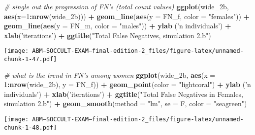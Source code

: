 \documentclass[]{article}
\newenvironment{Shaded}{\begin{snugshade}}{\end{snugshade}}
\newcommand{\KeywordTok}[1]{\textcolor[rgb]{0.13,0.29,0.53}{\textbf{#1}}}
\newcommand{\DataTypeTok}[1]{\textcolor[rgb]{0.13,0.29,0.53}{#1}}
\newcommand{\DecValTok}[1]{\textcolor[rgb]{0.00,0.00,0.81}{#1}}
\newcommand{\StringTok}[1]{\textcolor[rgb]{0.31,0.60,0.02}{#1}}
\newcommand{\CommentTok}[1]{\textcolor[rgb]{0.56,0.35,0.01}{\textit{#1}}}
\newcommand{\OperatorTok}[1]{\textcolor[rgb]{0.81,0.36,0.00}{\textbf{#1}}}
\newcommand{\NormalTok}[1]{#1}
\begin{document}
\begin{Shaded}
\begin{Highlighting}[]
\CommentTok{# single out the progression of FN's (total count values)}
\KeywordTok{ggplot}\NormalTok{(wide_2b, }\KeywordTok{aes}\NormalTok{(}\DataTypeTok{x=}\DecValTok{1}\OperatorTok{:}\KeywordTok{nrow}\NormalTok{(wide_2b))) }\OperatorTok{+}\StringTok{ }
\StringTok{  }\KeywordTok{geom_line}\NormalTok{(}\KeywordTok{aes}\NormalTok{(}\DataTypeTok{y =}\NormalTok{ FN_f, }\DataTypeTok{color =} \StringTok{"females"}\NormalTok{)) }\OperatorTok{+}
\StringTok{  }\KeywordTok{geom_line}\NormalTok{(}\KeywordTok{aes}\NormalTok{(}\DataTypeTok{y =}\NormalTok{ FN_m, }\DataTypeTok{color =} \StringTok{"males"}\NormalTok{)) }\OperatorTok{+}
\StringTok{  }\KeywordTok{ylab}\NormalTok{ (}\StringTok{'n individuals'}\NormalTok{) }\OperatorTok{+}\StringTok{ }\KeywordTok{xlab}\NormalTok{(}\StringTok{'iterations'}\NormalTok{) }\OperatorTok{+}
\StringTok{  }\KeywordTok{ggtitle}\NormalTok{(}\StringTok{"Total False Negatives, simulation 2.b"}\NormalTok{)}
\end{Highlighting}
\end{Shaded}

\texttt{[image: ABM---SOCCULT-EXAM---final-edition-2\_files/figure-latex/unnamed-chunk-1-47.pdf]}

\begin{Shaded}
\begin{Highlighting}[]
\CommentTok{# what is the trend in FN's among women}
\KeywordTok{ggplot}\NormalTok{(wide_2b, }\KeywordTok{aes}\NormalTok{(}\DataTypeTok{x =} \DecValTok{1}\OperatorTok{:}\KeywordTok{nrow}\NormalTok{(wide_2b), }\DataTypeTok{y =}\NormalTok{ FN_f)) }\OperatorTok{+}\StringTok{ }
\StringTok{  }\KeywordTok{geom_point}\NormalTok{(}\DataTypeTok{color =} \StringTok{"lightcoral"}\NormalTok{) }\OperatorTok{+}
\StringTok{  }\KeywordTok{ylab}\NormalTok{ (}\StringTok{'n individuals'}\NormalTok{) }\OperatorTok{+}\StringTok{ }\KeywordTok{xlab}\NormalTok{(}\StringTok{'iterations'}\NormalTok{) }\OperatorTok{+}
\StringTok{  }\KeywordTok{ggtitle}\NormalTok{(}\StringTok{"Total False Negatives in Females, simulation 2.b"}\NormalTok{) }\OperatorTok{+}
\StringTok{  }\KeywordTok{geom_smooth}\NormalTok{(}\DataTypeTok{method =} \StringTok{"lm"}\NormalTok{, }\DataTypeTok{se =}\NormalTok{ F, }\DataTypeTok{color =} \StringTok{"seagreen"}\NormalTok{)}
\end{Highlighting}
\end{Shaded}

\texttt{[image: ABM---SOCCULT-EXAM---final-edition-2\_files/figure-latex/unnamed-chunk-1-48.pdf]}
\end{document}

